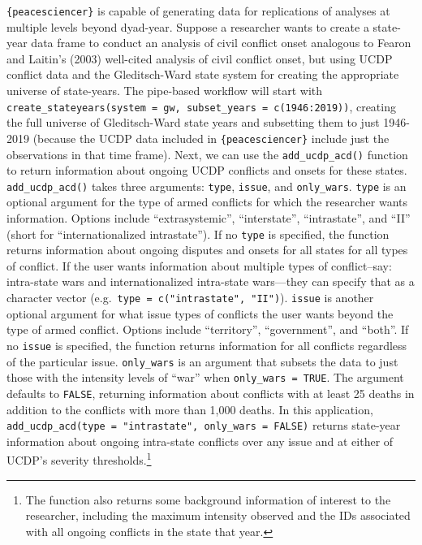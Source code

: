 \documentclass[
  11pt,
]{article}
\begin{document}
\texttt{\{peacesciencer\}} is capable of generating data for replications of analyses at multiple levels beyond dyad-year. Suppose a researcher wants to create a state-year data frame to conduct an analysis of civil conflict onset analogous to Fearon and Laitin's (2003) well-cited analysis of civil conflict onset, but using UCDP conflict data and the Gleditsch-Ward state system for creating the appropriate universe of state-years. The pipe-based workflow will start with \texttt{create\_stateyears(system\ =\ \textquotesingle{}gw\textquotesingle{},\ subset\_years\ =\ c(1946:2019))}, creating the full universe of Gleditsch-Ward state years and subsetting them to just 1946-2019 (because the UCDP data included in \texttt{\{peacesciencer\}} include just the observations in that time frame). Next, we can use the \texttt{add\_ucdp\_acd()} function to return information about ongoing UCDP conflicts and onsets for these states. \texttt{add\_ucdp\_acd()} takes three arguments: \texttt{type}, \texttt{issue}, and \texttt{only\_wars}. \texttt{type} is an optional argument for the type of armed conflicts for which the researcher wants information. Options include ``extrasystemic'', ``interstate'', ``intrastate'', and ``II'' (short for ``internationalized intrastate''). If no \texttt{type} is specified, the function returns information about ongoing disputes and onsets for all states for all types of conflict. If the user wants information about multiple types of conflict--say: intra-state wars and internationalized intra-state wars---they can specify that as a character vector (e.g.~\texttt{type\ =\ c("intrastate",\ "II")}). \texttt{issue} is another optional argument for what issue types of conflicts the user wants beyond the type of armed conflict. Options include ``territory'', ``government'', and ``both''. If no \texttt{issue} is specified, the function returns information for all conflicts regardless of the particular issue. \texttt{only\_wars} is an argument that subsets the data to just those with the intensity levels of ``war'' when \texttt{only\_wars\ =\ TRUE}. The argument defaults to \texttt{FALSE}, returning information about conflicts with at least 25 deaths in addition to the conflicts with more than 1,000 deaths. In this application, \texttt{add\_ucdp\_acd(type\ =\ "intrastate",\ only\_wars\ =\ FALSE)} returns state-year information about ongoing intra-state conflicts over any issue and at either of UCDP's severity thresholds.\footnote{The function also returns some background information of interest to the researcher, including the maximum intensity observed and the IDs associated with all ongoing conflicts in the state that year.}
\end{document}

